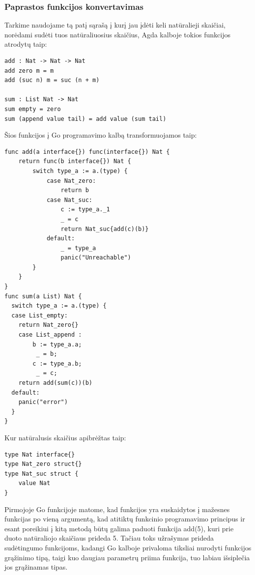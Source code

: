 \documentclass{VUMIFPSkursinis}
\begin{document}
\subsubsection{Paprastos funkcijos konvertavimas}
Tarkime naudojame tą patį sąrašą į kurį jau įdėti keli natūralieji skaičiai, norėdami sudėti tuos natūraliuosius skaičius, Agda kalboje tokios funkcijos atrodytų taip:
\begin{lstlisting}
add : Nat -> Nat -> Nat
add zero m = m
add (suc n) m = suc (n + m)

sum : List Nat -> Nat
sum empty = zero
sum (append value tail) = add value (sum tail)
\end{lstlisting}
Šios funkcijos į Go programavimo kalbą transformuojamos taip:
\begin{lstlisting}[language=GoCust]
func add(a interface{}) func(interface{}) Nat {
	return func(b interface{}) Nat {
		switch type_a := a.(type) {
			case Nat_zero:
				return b
			case Nat_suc:
				c := type_a._1
				_ = c
				return Nat_suc{add(c)(b)}
			default:
				_ = type_a
				panic("Unreachable")
		}
	}
}
func sum(a List) Nat {
  switch type_a := a.(type) {
  case List_empty:
    return Nat_zero{}
	case List_append : 
		b := type_a.a;
		 _ = b;
		c := type_a.b;
		 _ = c;
    return add(sum(c))(b)
  default:
    panic("error")
  }
}
	\end{lstlisting}
	Kur natūralusis skaičius apibrėžtas taip:
	\begin{lstlisting}[language=GoCust]
type Nat interface{}
type Nat_zero struct{}
type Nat_suc struct {
	value Nat
}
\end{lstlisting}

Pirmojoje Go funkcijoje matome, kad funkcijos yra suskaidytos į mažesnes funkcijas po vieną argumentą, kad atitiktų funkcinio programavimo principus ir esant poreikiui į kitą metodą būtų galima paduoti funkcija add(5), kuri prie duoto natūraliojo skaičiaus prideda 5. Tačiau toks užrašymas prideda sudėtingumo funkcijoms, kadangi Go kalboje privaloma tiksliai nurodyti funkcijos grąžinimo tipą, taigi kuo daugiau parametrų priima funkcija, tuo labiau išsiplečia jos grąžinamas tipas.
\end{document}
